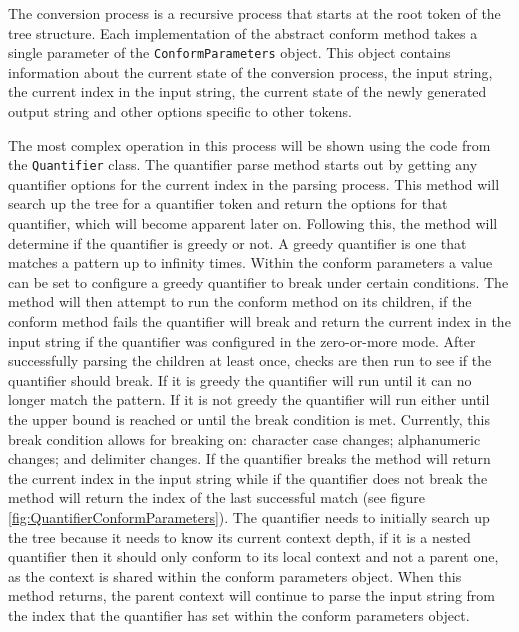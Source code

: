 The conversion process is a recursive process that starts at the root token of the tree structure. Each implementation of the abstract conform method takes a single parameter of the \texttt{ConformParameters} object. This object contains information about the current state of the conversion process, the input string, the current index in the input string, the current state of the newly generated output string and other options specific to other tokens.

The most complex operation in this process will be shown using the code from the \texttt{Quantifier} class. The quantifier parse method starts out by getting any quantifier options for the current index in the parsing process. This method will search up the tree for a quantifier token and return the options for that quantifier, which will become apparent later on. Following this, the method will determine if the quantifier is greedy or not. A greedy quantifier is one that matches a pattern up to infinity times. Within the conform parameters a value can be set to configure a greedy quantifier to break under certain conditions. The method will then attempt to run the conform method on its children, if the conform method fails the quantifier will break and return the current index in the input string if the quantifier was configured in the zero-or-more mode. After successfully parsing the children at least once, checks are then run to see if the quantifier should break. If it is greedy the quantifier will run until it can no longer match the pattern. If it is not greedy the quantifier will run either until the upper bound is reached or until the break condition is met. Currently, this break condition allows for breaking on: character case changes; alphanumeric changes; and delimiter changes. If the quantifier breaks the method will return the current index in the input string while if the quantifier does not break the method will return the index of the last successful match (see figure \ref{fig:QuantifierConformParameters}). The quantifier needs to initially search up the tree because it needs to know its current context depth, if it is a nested quantifier then it should only conform to its local context and not a parent one, as the context is shared within the conform parameters object. When this method returns, the parent context will continue to parse the input string from the index that the quantifier has set within the conform parameters object.

